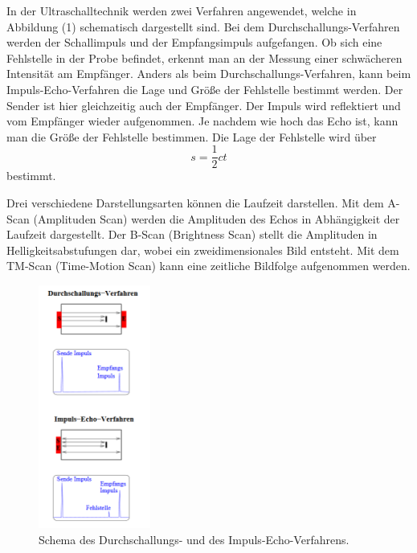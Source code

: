 \noindent In der Ultraschalltechnik werden zwei Verfahren angewendet, welche in Abbildung (1) schematisch dargestellt sind.
Bei dem Durchschallungs-Verfahren werden der Schallimpuls und der Empfangsimpuls aufgefangen. Ob sich eine Fehlstelle in der Probe befindet, erkennt man an der Messung einer schwächeren Intensität am Empfänger.
Anders als beim Durchschallungs-Verfahren, kann beim Impuls-Echo-Verfahren die Lage und Größe der Fehlstelle bestimmt werden. Der Sender ist hier gleichzeitig auch der Empfänger. Der Impuls wird reflektiert und vom Empfänger wieder aufgenommen.
Je nachdem wie hoch das Echo ist, kann man die Größe der Fehlstelle bestimmen.
Die Lage der Fehlstelle wird über
\begin{equation}
s = \frac{1}{2}ct 
\end{equation}
bestimmt.

\noindent Drei verschiedene Darstellungsarten können die Laufzeit darstellen.
Mit dem A-Scan (Amplituden Scan) werden die Amplituden des Echos in Abhängigkeit der Laufzeit dargestellt.
Der B-Scan (Brightness Scan) stellt die Amplituden in Helligkeitsabstufungen dar, wobei ein zweidimensionales Bild entsteht.
Mit dem TM-Scan (Time-Motion Scan) kann eine zeitliche Bildfolge aufgenommen werden.

\begin{figure}[H]
  \centering
  \includegraphics[height=8cm]{verfahren.png}
  \caption{Schema des Durchschallungs- und des Impuls-Echo-Verfahrens. \cite[S.2]{kent}}
\end{figure}


